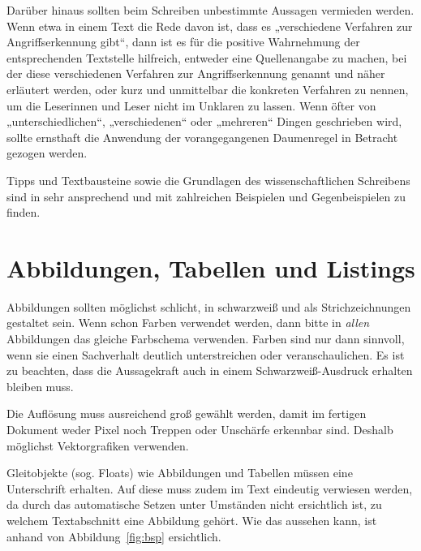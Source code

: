 \documentclass[
    fontsize=12pt,
    headings=small,
    parskip=half,           %
    bibliography=totoc,
    numbers=noenddot,       %
    open=any,               %
    ]{scrreprt}
\begin{document}
Darüber hinaus sollten beim Schreiben unbestimmte Aussagen vermieden werden. Wenn etwa in einem Text die Rede davon ist, dass es „verschiedene Verfahren zur Angriffserkennung gibt“, dann ist es für die positive Wahrnehmung der entsprechenden Textstelle hilfreich, entweder eine Quellenangabe zu machen, bei der diese verschiedenen Verfahren zur Angriffserkennung genannt und näher erläutert werden, oder kurz und unmittelbar die konkreten Verfahren zu nennen, um die Leserinnen und Leser nicht im Unklaren zu lassen. Wenn öfter von „unterschiedlichen“, „verschiedenen“ oder „mehreren“ Dingen geschrieben wird, sollte ernsthaft die Anwendung der vorangegangenen Daumenregel in Betracht gezogen werden. 

Tipps und Textbausteine sowie die Grundlagen des wissenschaftlichen Schreibens sind in \cite{Küht2021} sehr ansprechend und mit zahlreichen Beispielen und Gegenbeispielen zu finden.

\section{Abbildungen, Tabellen und Listings}

Abbildungen sollten möglichst schlicht, in schwarzweiß und als Strichzeichnungen gestaltet sein. Wenn schon Farben verwendet werden, dann bitte in \emph{allen} Abbildungen das gleiche Farbschema verwenden. Farben sind nur dann sinnvoll, wenn sie einen Sachverhalt deutlich unterstreichen oder veranschaulichen. Es ist zu beachten, dass die Aussagekraft auch in einem Schwarzweiß-Ausdruck erhalten bleiben muss.

Die Auflösung muss ausreichend groß gewählt werden, damit im fertigen Dokument weder Pixel noch Treppen oder Unschärfe erkennbar sind. Deshalb möglichst Vektorgrafiken verwenden.

Gleitobjekte (sog. Floats) wie Abbildungen und Tabellen müssen eine Unterschrift erhalten. Auf diese muss zudem im Text eindeutig verwiesen werden, da durch das automatische Setzen unter Umständen nicht ersichtlich ist, zu welchem Textabschnitt eine Abbildung gehört. Wie das aussehen kann, ist anhand von Abbildung~\ref{fig:bsp} ersichtlich.
\end{document}
